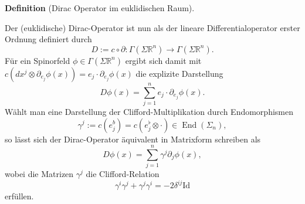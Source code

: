 \documentclass[10pt, letterpaper]{article}
\newcommand{\CustomHeading}[3]{%
  \par\medskip\noindent%
  \textbf{#1 #2} \textnormal{(#3)}.\enskip%
}
\newenvironment{DEF}[2]{\CustomHeading{Definition}{#1}{#2}}{}
\begin{document}
\begin{DEF}{}{Dirac Operator im euklidischen Raum}
  Der (euklidische) Dirac-Operator ist nun als der lineare Differentialoperator erster Ordnung definiert durch
  $$
  D:=c \circ \partial: \Gamma\left(\Sigma \mathbb{R}^n\right) \longrightarrow \Gamma\left(\Sigma \mathbb{R}^n\right) .
  $$
  Für ein Spinorfeld $\phi \in \Gamma\left(\Sigma \mathbb{R}^n\right)$ ergibt sich damit mit $c(dx^j\otimes \partial_{e_j}\phi(x))=e_j\cdot \partial_{e_j}\phi(x)$ die explizite Darstellung
  $$
  D \phi(x)=\sum_{j=1}^n e_j \cdot \partial_{e_j} \phi(x) .
  $$
  Wählt man eine Darstellung der Clifford-Multiplikation durch Endomorphismen 
  $$\gamma^j:=c\left(e_j^b\right)=c\left(e_j^\flat\otimes \cdot \right) \in  \operatorname{End}\left(\Sigma_n\right),$$
  so lässt sich der Dirac-Operator äquivalent in Matrixform schreiben als
  $$
  D \phi(x)=\sum_{j=1}^n \gamma^j \partial_j \phi(x),
  $$
  wobei die Matrizen $\gamma^j$ die Clifford-Relation
  $$
  \gamma^i \gamma^j+\gamma^j \gamma^i=-2 \delta^{i j} \mathrm{Id}
  $$
  erfüllen.
\end{DEF}
\end{document}
